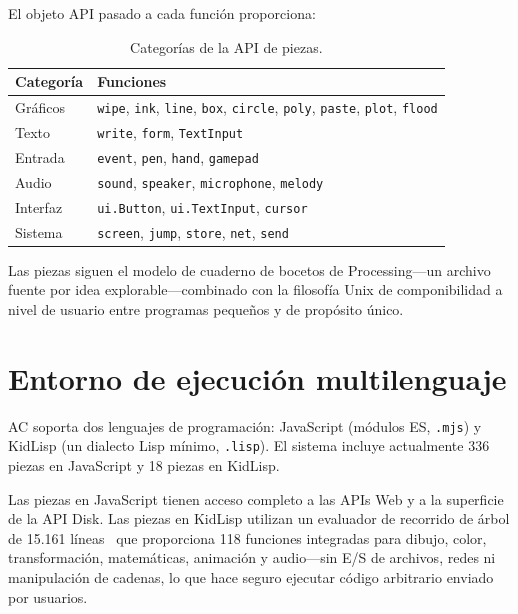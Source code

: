\documentclass[10pt,letterpaper,twocolumn]{article}
\begin{document}
El objeto API pasado a cada función proporciona:

\begin{table}[h]
\small
\centering
\begin{tabularx}{\columnwidth}{lX}
\toprule
\textbf{Categoría} & \textbf{Funciones} \\
\midrule
Gráficos & \texttt{wipe}, \texttt{ink}, \texttt{line}, \texttt{box}, \texttt{circle}, \texttt{poly}, \texttt{paste}, \texttt{plot}, \texttt{flood} \\
Texto & \texttt{write}, \texttt{form}, \texttt{TextInput} \\
Entrada & \texttt{event}, \texttt{pen}, \texttt{hand}, \texttt{gamepad} \\
Audio & \texttt{sound}, \texttt{speaker}, \texttt{microphone}, \texttt{melody} \\
Interfaz & \texttt{ui.Button}, \texttt{ui.TextInput}, \texttt{cursor} \\
Sistema & \texttt{screen}, \texttt{jump}, \texttt{store}, \texttt{net}, \texttt{send} \\
\bottomrule
\end{tabularx}
\caption{Categorías de la API de piezas.}
\label{tab:api}
\end{table}

Las piezas siguen el modelo de cuaderno de bocetos de Processing---un archivo fuente por idea explorable---combinado con la filosofía Unix de componibilidad a nivel de usuario entre programas pequeños y de propósito único.


\section{Entorno de ejecución multilenguaje}
\label{sec:languages}

AC soporta dos lenguajes de programación: JavaScript (módulos ES, \texttt{.mjs}) y KidLisp (un dialecto Lisp mínimo, \texttt{.lisp}). El sistema incluye actualmente 336 piezas en JavaScript y 18 piezas en KidLisp.

Las piezas en JavaScript tienen acceso completo a las APIs Web y a la superficie de la API Disk. Las piezas en KidLisp utilizan un evaluador de recorrido de árbol de 15.161 líneas~\citep{scudder2026kidlisp} que proporciona 118 funciones integradas para dibujo, color, transformación, matemáticas, animación y audio---sin E/S de archivos, redes ni manipulación de cadenas, lo que hace seguro ejecutar código arbitrario enviado por usuarios.
\end{document}
